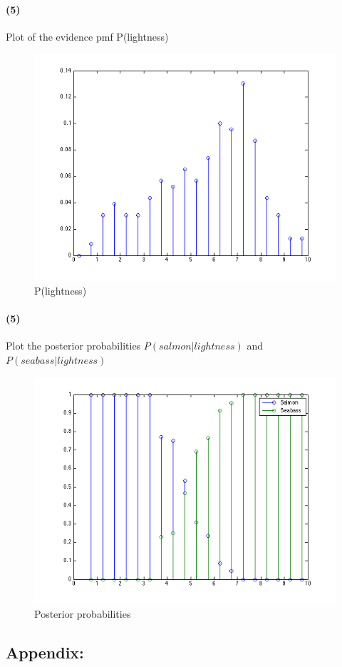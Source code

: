 \documentclass[a4paper]{article}
\begin{document}
\paragraph{(5) } Plot of the evidence pmf P(lightness) ~\\
\begin{figure}[h!]
  \centering
    \includegraphics[scale=.6]{images/p_lightness.png}
  \caption{P(lightness)}
\end{figure}

%
%
\paragraph{(5) } Plot the posterior probabilities $P(salmon|lightness)$ and $P(seabass|lightness)$ ~\\
\begin{figure}[h!]
  \centering
    \includegraphics[scale=.6]{images/posterior_probabilities.png}
  \caption{Posterior probabilities}
\end{figure}

\newpage
\subsection*{Appendix:}

\end{document}
